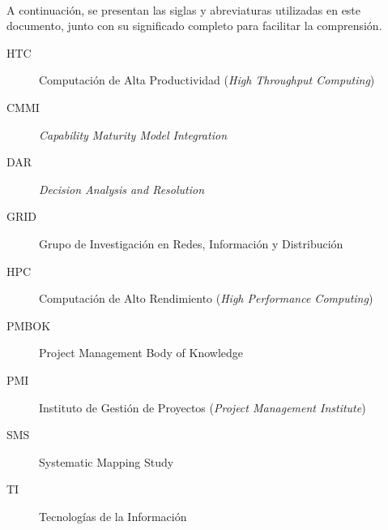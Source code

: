 \label{cap:siglas}
\mbox{}\\
A continuación, se presentan las siglas y abreviaturas utilizadas en este documento, junto con su significado completo para facilitar la comprensión.
\begin{description}
	\item[HTC] Computación de Alta Productividad (\textit{High Throughput Computing})
	\item[CMMI] \textit{Capability Maturity Model Integration}
	\item[DAR] \textit{Decision Analysis and Resolution}
	\item[GRID] Grupo de Investigación en Redes, Información y Distribución
	\item[HPC] Computación de Alto Rendimiento (\textit{High Performance Computing})
	\item[PMBOK] Project Management Body of Knowledge
	\item[PMI] Instituto de Gestión de Proyectos (\textit{Project Management Institute})
	\item[SMS] Systematic Mapping Study
	\item[TI] Tecnologías de la Información
\end{description}
